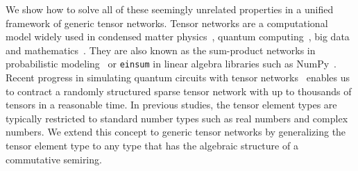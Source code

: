 \documentclass[onefignum, onetabnum]{siamart190516}
\newcommand{\<}{\langle}
\renewcommand{\>}{\rangle}
\newcommand{\blue}[1]{[{\bf  \color{blue}{JG: #1}}]}
\newcommand{\purple}[1]{[{\bf  \color{purple}{MC: #1}}]}
\newcounter{example}
\begin{document}
We show how to solve all of these seemingly unrelated properties in a unified framework of generic tensor networks. Tensor networks are a computational model widely used in condensed matter physics~\cite{Orus2014}, quantum computing~\cite{Markov2008}, big data~\cite{Cichocki2014} and mathematics~\cite{Oseledets2011}.
They are also known as the sum-product networks in probabilistic modeling~\cite{Bishop2006} or \texttt{einsum} in linear algebra libraries such as NumPy~\cite{Harris2020}.
Recent progress in simulating quantum circuits with tensor networks~\cite{Gray2021, Pan2021, Kalachev2021} enables us to contract a randomly structured sparse tensor network with up to thousands of tensors in a reasonable time.
In previous studies, the tensor element types are typically restricted to standard number types such as real numbers and complex numbers.
We extend this concept to generic tensor networks by generalizing the tensor element type to any type that has the algebraic structure of a commutative semiring.

\end{document}
